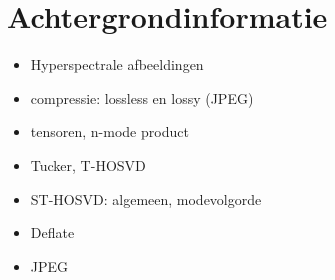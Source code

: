 \chapter{Achtergrondinformatie}
\label{hoofdstuk:achtergrond}

\begin{itemize}
\item Hyperspectrale afbeeldingen
\item compressie: lossless en lossy (JPEG)
\item tensoren, n-mode product
\item Tucker, T-HOSVD
\item ST-HOSVD: algemeen, modevolgorde
\item Deflate
\item JPEG
\end{itemize}
